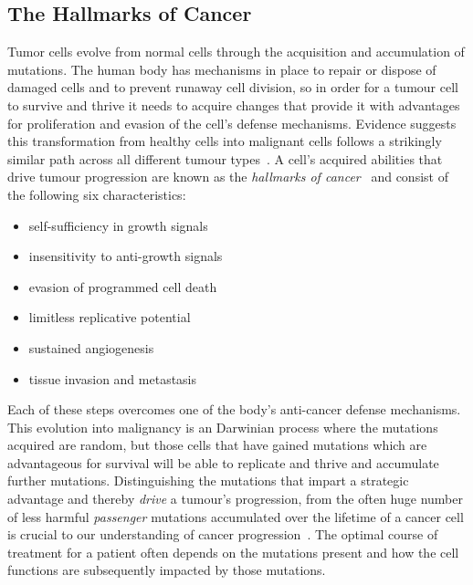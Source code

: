 \begin{justify}
\subsection{The Hallmarks of Cancer}

Tumor cells evolve from normal cells through the acquisition and accumulation of mutations. The human body has mechanisms in place to repair or dispose of damaged cells and to prevent runaway cell division, so in order for a tumour cell to survive and thrive it needs to acquire changes that provide it with advantages for proliferation and evasion of the cell's defense mechanisms. Evidence suggests this transformation from healthy cells into malignant cells follows a strikingly similar path across all different tumour types~\cite{hanahan2000hallmarks}. A cell's acquired abilities that drive tumour progression are known as the \emph{hallmarks of cancer}~\cite{hanahan2000hallmarks,hanahan2011hallmarks} and consist of the following six characteristics:

\begin{itemize}
    \itemsep-0.5em
    \item self-sufficiency in growth signals
    \item insensitivity to anti-growth signals
    \item evasion of programmed cell death
    \item limitless replicative potential
    \item sustained angiogenesis
    \item tissue invasion and metastasis
\end{itemize}

Each of these steps overcomes one of the body's anti-cancer defense mechanisms. This evolution into malignancy is an Darwinian process where the mutations acquired are random, but those cells that have gained mutations which are advantageous for survival will be able to replicate and thrive and accumulate further mutations. Distinguishing the mutations that impart a strategic advantage and thereby \emph{drive} a tumour's progression, from the often huge number of less harmful \emph{passenger} mutations accumulated over the lifetime of a cancer cell is crucial to our understanding of cancer progression~\cite{stratton2009cancer}. The optimal course of treatment for a patient often depends on the mutations present and how the cell functions are subsequently impacted by those mutations. %




\end{justify}
